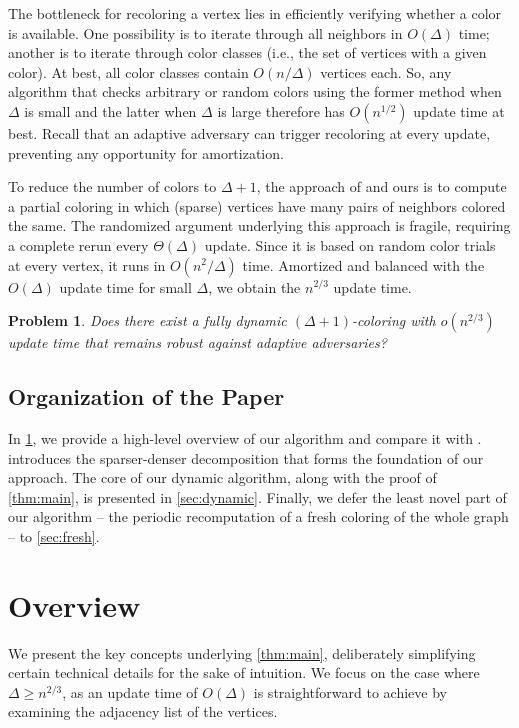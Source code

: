 \documentclass[a4paper,english,11pt]{amsart}
\newtheorem{problem}{Problem}
\theoremstyle{definition}
\renewcommand{\geq}{\geqslant}
\begin{document}
The bottleneck for recoloring a vertex lies in efficiently verifying whether a color is available. One possibility is to iterate through all neighbors in $O(\Delta)$ time; another is to iterate through color classes (i.e., the set of vertices with a given color). At best, all color classes contain $O(n/\Delta)$ vertices each. So, any algorithm that checks arbitrary or random colors using the former method when $\Delta$ is small and the latter when $\Delta$ is large therefore has $O(n^{1/2})$ update time at best. 
Recall that an adaptive adversary can trigger recoloring at every update, preventing any opportunity for amortization.



To reduce the number of colors to $\Delta+1$, the approach of \cite{EPS15,HSS18,ACK19,CLP20,BRW24} and ours is to compute a partial coloring in which (sparse) vertices have many pairs of neighbors colored the same. The randomized argument underlying this approach is fragile, requiring a complete rerun every $\Theta( \Delta )$ update. 
Since it is based on random color trials at every vertex, it runs in $O(n^2 / \Delta)$ time. Amortized and balanced with the $O(\Delta)$ update time for small $\Delta$, we obtain the $n^{2/3}$ update time.

\begin{problem}
Does there exist a fully dynamic $(\Delta+1)$-coloring with $o(n^{2/3})$ update time that remains robust against adaptive adversaries?
\end{problem}


\subsection{Organization of the Paper}
In \cref{sec:technical-overview}, we provide a high-level overview of our algorithm and compare it with \cite{BRW24}.
 introduces the sparser-denser decomposition that forms the foundation of our approach.
The core of our dynamic algorithm, along with the proof of \cref{thm:main}, is presented in \cref{sec:dynamic}.
Finally, we defer the least novel part of our algorithm  -- the periodic recomputation of a fresh coloring of the whole graph -- to \cref{sec:fresh}.

\section{Overview}
\label{sec:technical-overview}

We present the key concepts underlying \cref{thm:main}, deliberately simplifying certain technical details for the sake of intuition. We focus on the case where $\Delta \geq n^{2/3}$, as an update time of $O(\Delta)$ is straightforward to achieve by examining the adjacency list of the vertices.
\end{document}
